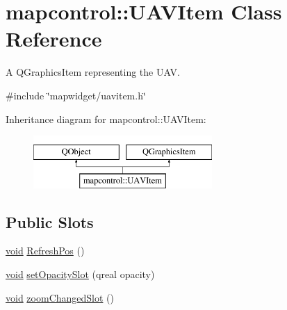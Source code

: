 \hypertarget{classmapcontrol_1_1_u_a_v_item}{\section{mapcontrol\-:\-:U\-A\-V\-Item Class Reference}
\label{classmapcontrol_1_1_u_a_v_item}
}


A Q\-Graphics\-Item representing the U\-A\-V.  




{\ttfamily \#include \char`\"{}mapwidget/uavitem.\-h\char`\"{}}

Inheritance diagram for mapcontrol\-:\-:U\-A\-V\-Item\-:\begin{figure}[H]
\begin{center}
\leavevmode
\includegraphics[height=2.000000cm]{classmapcontrol_1_1_u_a_v_item}
\end{center}
\end{figure}
\subsection*{Public Slots}
\begin{DoxyCompactItemize}
\item 
\hyperlink{group___u_a_v_objects_plugin_ga444cf2ff3f0ecbe028adce838d373f5c}{void} \hyperlink{group___o_p_map_widget_gaf033b133e7911ff98ebc1b6977818fc8}{Refresh\-Pos} ()
\item 
\hyperlink{group___u_a_v_objects_plugin_ga444cf2ff3f0ecbe028adce838d373f5c}{void} \hyperlink{group___o_p_map_widget_ga3b9172d484d3efba36eeae6bddb3f8f2}{set\-Opacity\-Slot} (qreal opacity)
\item 
\hyperlink{group___u_a_v_objects_plugin_ga444cf2ff3f0ecbe028adce838d373f5c}{void} \hyperlink{group___o_p_map_widget_ga53c572c774d383eb6b672d3ef1da6424}{zoom\-Changed\-Slot} ()
\end{DoxyCompactItemize}

